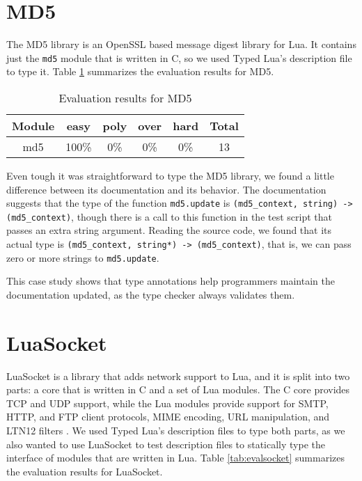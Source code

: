 \section{MD5}

The MD5 library is an OpenSSL based message digest library for Lua.
It contains just the \texttt{md5} module that is written in C,
so we used Typed Lua's description file to type it.
Table \ref{tab:evalmd5} summarizes the evaluation results for MD5.

\begin{table}[!ht]
\begin{center}
\begin{tabular}{|c|c|c|c|c|c|}
\hline
\textbf{Module} & \textbf{easy} & \textbf{poly} & \textbf{over} & \textbf{hard} & \textbf{Total} \\
\hline
md5 & 100\% & 0\% & 0\% & 0\% & 13 \\ %
\hline
\end{tabular}
\end{center}
\caption{Evaluation results for MD5}
\label{tab:evalmd5}
\end{table}

Even tough it was straightforward to type the MD5 library,
we found a little difference between its documentation and its behavior.
The documentation suggests that the type of the function \texttt{md5.update}
is \texttt{(md5\string_context, string) -> (md5\string_context)},
though there is a call to this function in the test script that passes
an extra string argument.
Reading the source code, we found that its actual type is
\texttt{(md5\string_context, string*) -> (md5\string_context)},
that is, we can pass zero or more strings to \texttt{md5.update}.

This case study shows that type annotations help programmers maintain the
documentation updated, as the type checker always validates them.

\section{LuaSocket}

LuaSocket is a library that adds network support to Lua,
and it is split into two parts: a core that is written in C and a set of
Lua modules.
The C core provides TCP and UDP support, while the Lua modules provide
support for SMTP, HTTP, and FTP client protocols, MIME encoding,
URL manipulation, and LTN12 filters \citep{nehab2008ltn012}.
We used Typed Lua's description files to type both parts, as we also
wanted to use LuaSocket to test description files to statically type
the interface of modules that are written in Lua.
Table \ref{tab:evalsocket} summarizes the evaluation results for LuaSocket.

